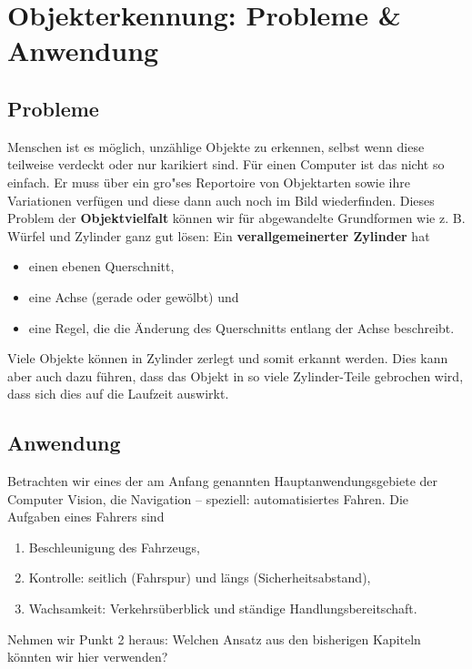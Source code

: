 \section{Objekterkennung: Probleme \& Anwendung}


\subsection{Probleme}

Menschen ist es möglich, unzählige Objekte zu erkennen, selbst wenn diese teilweise verdeckt oder nur karikiert sind. Für einen Computer ist das nicht so einfach. Er muss über ein gro"ses Reportoire von Objektarten sowie ihre Variationen verfügen und diese dann auch noch im Bild wiederfinden. Dieses Problem der \textbf{Objektvielfalt} können wir für abgewandelte Grundformen wie z. B. Würfel und Zylinder ganz gut lösen: Ein \textbf{verallgemeinerter Zylinder} \label{Zylinder} hat
\begin{itemize}
\item einen ebenen Querschnitt,
\item eine Achse (gerade oder gewölbt) und
\item eine Regel, die die Änderung des Querschnitts entlang der Achse beschreibt.
\end{itemize}
Viele Objekte können in Zylinder zerlegt und somit erkannt werden. Dies kann aber auch dazu führen, dass das Objekt in so viele Zylinder-Teile gebrochen wird, dass sich dies auf die Laufzeit auswirkt.

\subsection{Anwendung}
Betrachten wir eines der am Anfang genannten Hauptanwendungsgebiete der Computer Vision, die Navigation -- speziell: automatisiertes Fahren. Die Aufgaben eines Fahrers sind
\begin{enumerate}
\item Beschleunigung des Fahrzeugs,
\item Kontrolle: seitlich (Fahrspur) und längs (Sicherheitsabstand),
\item Wachsamkeit: Verkehrsüberblick und ständige Handlungsbereitschaft.
\end{enumerate}
Nehmen wir Punkt 2 heraus: Welchen Ansatz aus den bisherigen Kapiteln könnten wir hier verwenden?

